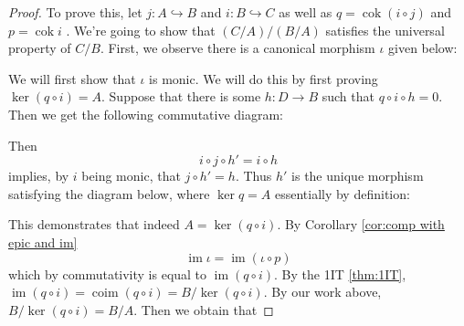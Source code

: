 \documentclass{article}
\DeclareMathOperator{\im}{\mathrm{im}}
\DeclareMathOperator{\coim}{\mathrm{coim}}
\DeclareMathOperator{\cok}{\mathrm{cok}}
\begin{document}
\begin{proof}
    To prove this, let $j:A\hookrightarrow B$ and $i: B\hookrightarrow C$ as well as $q=\cok (i\circ j)$ and $p=\cok i$ . We're going to show that $(C/A)/(B/A)$ satisfies the universal property of $C/B$. First, we observe there is a canonical morphism $\iota$ given below:
    \begin{center}
    \end{center}
    We will first show that $\iota$ is monic. We will do this by first proving $\ker(q\circ i)=A$. Suppose that there is some $h:D\to B$ such that $q\circ i\circ h=0$. Then we get the following commutative diagram:
    \begin{center}
    \end{center}
    Then
    \[
    i\circ j\circ h'=i\circ h
    \]
    implies, by $i$ being monic, that $j\circ h'=h$. Thus $h'$ is the unique morphism satisfying the diagram below, where $\ker q=A$ essentially by definition:
    \begin{center}
    \end{center}
    This demonstrates that indeed $A=\ker(q\circ i)$. By Corollary \ref{cor:comp with epic and im}
    \[
    \im \iota=\im(\iota \circ p)
    \]
    which by commutativity is equal to $\im(q\circ i)$. By the 1IT \ref{thm:1IT}, $\im(q\circ i)=\coim(q\circ i)=B/\ker(q\circ i)$. By our work above, $B/\ker(q\circ i)=B/A$. Then we obtain that

\end{proof}
\end{document}
